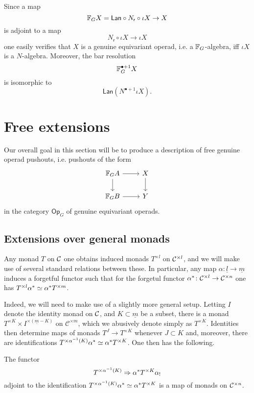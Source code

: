 \documentclass[a4paper,10pt]{article}%
\begin{document}
\begin{remark}
Since a map 
\[\mathbb{F}_G X =\mathsf{Lan} \circ N_{\mathsf{r}} \circ \iota X \to X\]
is adjoint to a map
\[N_{\mathsf{r}} \circ \iota X \to \iota X\]
one easily verifies that 
$X$ is a genuine equivariant operad, i.e. 
a $\mathbb{F}_G$-algebra, iff 
$\iota X$ is a $N$-algebra.
Moreover, the bar resolution
\[
	\mathbb{F}_G^{\bullet +1} X 
\]
is isomorphic to
\[
	\mathsf{Lan} \left( N^{\bullet +1} \iota X \right).
\]
\end{remark}


\section{Free extensions}

Our overall goal in this section will be to produce a description of free genuine operad pushouts, i.e. pushouts of the form
\[
\begin{tikzcd}
	\mathbb{F}_G A \ar{r} \ar{d} & X \ar{d}
\\
	\mathbb{F}_G B \ar{r} & Y
\end{tikzcd}
\]
in the category $\mathsf{Op}_G$ of genuine equivariant operads.



\subsection{Extensions over general monads}

Any monad $T$ on $\mathcal{C}$ one obtains induced monads $T^{\times l}$ on $\mathcal{C}^{\times l}$, and we will make use of several standard relations between these.
In particular, any map $\alpha \colon \underline{l} \to \underline{m}$ induces a forgetful functor
such that for the forgetul functor 
$\alpha^{\**} \colon \C^{\times l} \to \C^{\times n}$
one has $T^{\times l} \alpha^{\**} \simeq  \alpha^{\**} T^{\times m}$.


Indeed, we will need to make use of a slightly more general setup. Letting $I$ denote the identity monad on $\mathcal{C}$, and $K \subset \underline{m}$ be a subset, there is a monad $T^{\times K} \times I^{\times(\underline{m}-K)}$ on $\mathcal{C}^{\times m}$, which we abusively denote simply as $T^{\times K}$. Identities then determine maps of monads 
$T^{J} \to T^{\times K}$ whenever $J \subset K$
and, moreover, there are identifications
$T^{\times \alpha^{-1}(K)} \alpha^{\**} \simeq \alpha^{\**} T^{\times K}$.
One then has the following.


\begin{proposition}\label{MONADICFUN PROP}
	The functor
\begin{equation}\label{MONADFUNCTORALPHA EQ}
	T^{\times \alpha^{-1} (K)} \Rightarrow \alpha^{\**} T^{\times K} \alpha_{!}
\end{equation}
adjoint to the identification 
$T^{\times \alpha^{-1} (K)} \alpha^{\**} \simeq \alpha^{\**} T^{\times K}$
is a map of monads on $\mathcal{C}^{\times n}$.
\end{proposition}
\end{document}
